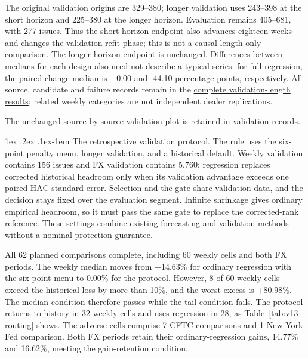 \documentclass[10pt,a4paper]{article}
\makeatletter
\renewcommand\paragraph{\@startsection{paragraph}{4}{\z@}%
  {1ex \@plus .2ex \@minus .1ex}{-1em}%
  {\normalfont\normalsize\bfseries}}
\makeatother
\begin{document}
The original validation origins are 329--380; longer validation uses 243--398 at the short horizon and 225--380 at the longer horizon. Evaluation remains 405--681, with 277 issues. Thus the short-horizon endpoint also advances eighteen weeks and changes the validation refit phase; this is not a causal length-only comparison. The longer-horizon endpoint is unchanged. Differences between medians for each design also need not describe a typical series: for full regression, the paired-change median is +0.00 and -44.10 percentage points, respectively. All source, candidate and failure records remain in the \href{https://github.com/ByronLi0207/financial-mathematics-paper-20261020/tree/revision-v13/results/v13/nyfed-validation}{complete validation-length results}; related weekly categories are not independent dealer replications.

The unchanged source-by-source validation plot is retained in \href{https://github.com/ByronLi0207/financial-mathematics-paper-20261020/blob/submission-final/EXTENDED_RESULTS.md#asmbi-extended-s38}{validation records}.


\FloatBarrier
\paragraph{The retrospective validation protocol.}
The rule uses the six-point penalty menu, longer validation, and a historical default. Weekly validation contains 156 issues and FX validation contains 5,760; regression replaces corrected historical headroom only when its validation advantage exceeds one paired HAC standard error. Selection and the gate share validation data, and the decision stays fixed over the evaluation segment. Infinite shrinkage gives ordinary empirical headroom, so it must pass the same gate to replace the corrected-rank reference. These settings combine existing forecasting and validation methods without a nominal protection guarantee.

All 62 planned comparisons complete, including 60 weekly cells and both FX periods. The weekly median moves from +14.63\% for ordinary regression with the six-point menu to 0.00\% for the protocol. However, 8 of 60 weekly cells exceed the historical loss by more than 10\%, and the worst excess is +80.98\%. The median condition therefore passes while the tail condition fails. The protocol returns to history in 32 weekly cells and uses regression in 28, as Table~\ref{tab:v13-routing} shows. The adverse cells comprise 7 CFTC comparisons and 1 New York Fed comparison. Both FX periods retain their ordinary-regression gains, 14.77\% and 16.62\%, meeting the gain-retention condition.
\end{document}
